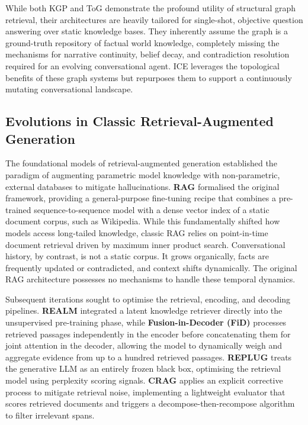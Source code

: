 \documentclass[11pt,a4paper]{article}
\begin{document}
While both KGP and ToG demonstrate the profound utility of structural graph retrieval, their architectures are heavily tailored for single-shot, objective question answering over static knowledge bases. They inherently assume the graph is a ground-truth repository of factual world knowledge, completely missing the mechanisms for narrative continuity, belief decay, and contradiction resolution required for an evolving conversational agent. ICE leverages the topological benefits of these graph systems but repurposes them to support a continuously mutating conversational landscape.

\subsection{Evolutions in Classic Retrieval-Augmented Generation}

The foundational models of retrieval-augmented generation established the paradigm of augmenting parametric model knowledge with non-parametric, external databases to mitigate hallucinations. \textbf{RAG} \citep{lewis2020rag} formalised the original framework, providing a general-purpose fine-tuning recipe that combines a pre-trained sequence-to-sequence model with a dense vector index of a static document corpus, such as Wikipedia. While this fundamentally shifted how models access long-tailed knowledge, classic RAG relies on point-in-time document retrieval driven by maximum inner product search. Conversational history, by contrast, is not a static corpus. It grows organically, facts are frequently updated or contradicted, and context shifts dynamically. The original RAG architecture possesses no mechanisms to handle these temporal dynamics.

Subsequent iterations sought to optimise the retrieval, encoding, and decoding pipelines. \textbf{REALM} \citep{guu2020realm} integrated a latent knowledge retriever directly into the unsupervised pre-training phase, while \textbf{Fusion-in-Decoder (FiD)} \citep{izacard2021fid} processes retrieved passages independently in the encoder before concatenating them for joint attention in the decoder, allowing the model to dynamically weigh and aggregate evidence from up to a hundred retrieved passages. \textbf{REPLUG} \citep{shi2024replug} treats the generative LLM as an entirely frozen black box, optimising the retrieval model using perplexity scoring signals. \textbf{CRAG} \citep{yan2024crag} applies an explicit corrective process to mitigate retrieval noise, implementing a lightweight evaluator that scores retrieved documents and triggers a decompose-then-recompose algorithm to filter irrelevant spans.
\end{document}
